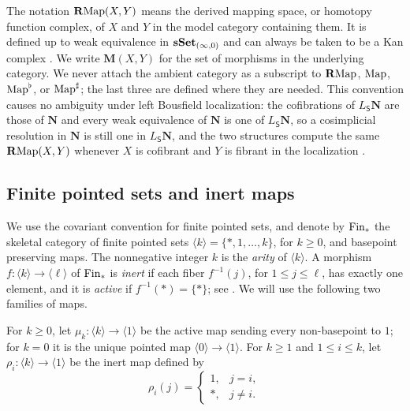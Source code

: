 \documentclass[10pt,reqno]{amsart}
\begin{document}
The notation $\mathbf{R}\mathrm{Map}(X,Y)$ means the derived mapping space, or
homotopy function complex, of $X$ and $Y$ in the model category
containing them. It is defined up to weak equivalence in
$\mathbf{sSet}_{(\infty,0)}$ and can always be taken to be a Kan complex
\cite[Definition~17.1.1 and Proposition~17.1.3]{hirschhorn2003model}.
We write $\mathbf M(X,Y)$ for the set of morphisms in the underlying
category. We never attach the ambient category as a subscript to
$\mathbf{R}\mathrm{Map}$, $\operatorname{Map}$, $\operatorname{Map}^\flat$, or $\operatorname{Map}^\sharp$; the last
three are defined where they are needed. This convention causes no ambiguity
under left Bousfield localization: the cofibrations of
$L_{\mathsf S}\mathbf N$ are those of $\mathbf N$ and every
weak equivalence of $\mathbf N$ is one of $L_{\mathsf S}\mathbf N$,
so a cosimplicial resolution in $\mathbf N$ is still one in
$L_{\mathsf S}\mathbf N$, and the two structures compute the same
$\mathbf{R}\mathrm{Map}(X,Y)$ whenever $X$ is cofibrant and $Y$ is fibrant in the
localization \cite[Definitions~16.1.2 and~17.1.1 and
Proposition~17.1.3]{hirschhorn2003model}.

\subsection{Finite pointed sets and inert maps}
\label{subsec:prelim_finite_pointed_sets}

We use the covariant convention for finite pointed sets, and denote by
$\mathrm{Fin}_*$ the skeletal category of finite pointed sets
$\langle k\rangle=\{*,1,\ldots,k\}$, for $k\geq0$, and basepoint
preserving maps. The nonnegative integer $k$ is the \emph{arity} of
$\langle k\rangle$. A morphism
$f:\langle k\rangle\to\langle\ell\rangle$ of $\mathrm{Fin}_*$ is \emph{inert}
if each fiber $f^{-1}(j)$, for $1\leq j\leq\ell$, has exactly one
element, and it is \emph{active} if $f^{-1}(*)=\{*\}$; see
\cite[Definitions~2.1.1.8 and~2.1.2.1]{LurieHA}. We will use the
following two families of maps.

\begin{notation}
\label{not:inert_and_fold}
For $k\geq0$, let $\mu_k:\langle k\rangle\to\langle1\rangle$ be
the active map sending every non-basepoint to $1$; for $k=0$ it is
the unique pointed map $\langle0\rangle\to\langle1\rangle$.
For $k\geq 1$ and $1\leq i\leq k$, let $\rho_i:\langle k\rangle\rightarrow\langle 1\rangle$
be the inert map defined by
\[
\rho_i(j)=
\begin{cases}
1, & j=i,\\
*, & j\neq i.
\end{cases}
\]
\end{notation}
\end{document}
